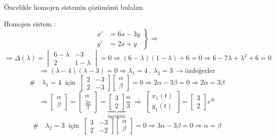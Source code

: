 \documentclass[11pt,a4paper]{article}
\begin{document}
\begin{cozum}
Öncelikle homojen sistemin çözümünü bulalım.

Homojen sistem :
\[
\left.\begin{aligned} x' &= 6x - 3y \\ y' &= 2x + y \end{aligned}\right\} \Rightarrow
\]
\[
\Rightarrow \Delta(\lambda) = \begin{vmatrix} 6-\lambda & -3 \\ 2 & 1-\lambda \end{vmatrix} = 0 \Rightarrow (6-\lambda)(1-\lambda) + 6 = 0 \Rightarrow 6 - 7\lambda + \lambda^2 + 6 = 0
\]
\[
\Rightarrow (\lambda-4)(\lambda-3) = 0 \Rightarrow \lambda_1 = 4 \ , \ \lambda_2 = 3 \ \rightarrow \text{özdeğerler}
\]
\[
\# \quad \lambda_1 = 4 \ \text{ için } \ \begin{bmatrix} 2 & -3 \\ 2 & -3 \end{bmatrix}\begin{bmatrix} \alpha \\ \beta \end{bmatrix} = 0 \Rightarrow 2\alpha - 3\beta = 0 \Rightarrow 2\alpha = 3\beta
\]
\[
\Rightarrow \begin{bmatrix} \alpha \\ \beta \end{bmatrix} = \begin{bmatrix} \alpha \\ \frac{2\alpha}{3} \end{bmatrix} = \underbrace{\begin{bmatrix} 3 \\ 2 \end{bmatrix}}_{\text{özvektör}}\frac{\alpha}{3} \ \Rightarrow \ \begin{bmatrix} x_1(t) \\ y_1(t) \end{bmatrix} = \begin{bmatrix} 3 \\ 2 \end{bmatrix}e^{4t}
\]
\[
\# \quad \lambda_2 = 3 \ \text{ için } \ \begin{bmatrix} 3 & -3 \\ 2 & -2 \end{bmatrix}\begin{bmatrix} \alpha \\ \beta \end{bmatrix} = 0 \Rightarrow 3\alpha - 3\beta = 0 \Rightarrow \alpha = \beta
\]
\end{cozum}
\end{document}
